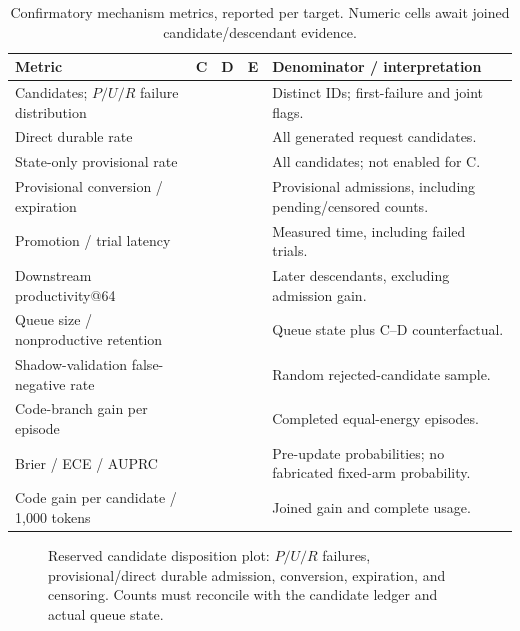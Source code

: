 \documentclass[final,5p,times,number]{elsarticle}
\newcommand{\missing}{\mbox{}}
\newcommand{\blankpanel}[1]{\fbox{\begin{minipage}[c][#1][c]{0.93\linewidth}\mbox{}\end{minipage}}}
\begin{document}
\begin{table}[t]
\centering\small
\caption{Confirmatory mechanism metrics, reported per target. Numeric cells await joined candidate/descendant evidence.}
\label{tab:mechanisms}
\begin{tabularx}{\textwidth}{Y c c c Y}
\toprule
Metric & C & D & E & Denominator / interpretation \\
\midrule
Candidates; $P/U/R$ failure distribution & \missing & \missing & \missing & Distinct IDs; first-failure and joint flags. \\
Direct durable rate & \missing & \missing & \missing & All generated request candidates. \\
State-only provisional rate & \missing & \missing & \missing & All candidates; not enabled for C. \\
Provisional conversion / expiration & \missing & \missing & \missing & Provisional admissions, including pending/censored counts. \\
Promotion / trial latency & \missing & \missing & \missing & Measured time, including failed trials. \\
Downstream productivity@64 & \missing & \missing & \missing & Later descendants, excluding admission gain. \\
Queue size / nonproductive retention & \missing & \missing & \missing & Queue state plus C--D counterfactual. \\
Shadow-validation false-negative rate & \missing & \missing & \missing & Random rejected-candidate sample. \\
Code-branch gain per episode & \missing & \missing & \missing & Completed equal-energy episodes. \\
Brier / ECE / AUPRC & \missing & \missing & \missing & Pre-update probabilities; no fabricated fixed-arm probability. \\
Code gain per candidate / 1,000 tokens & \missing & \missing & \missing & Joined gain and complete usage. \\
\bottomrule
\end{tabularx}
\end{table}

\begin{figure}[t]
\centering\blankpanel{26mm}
\caption{Reserved candidate disposition plot: $P/U/R$ failures, provisional/direct durable admission, conversion, expiration, and censoring. Counts must reconcile with the candidate ledger and actual queue state.}
\label{fig:dispositions}
\end{figure}
\end{document}
